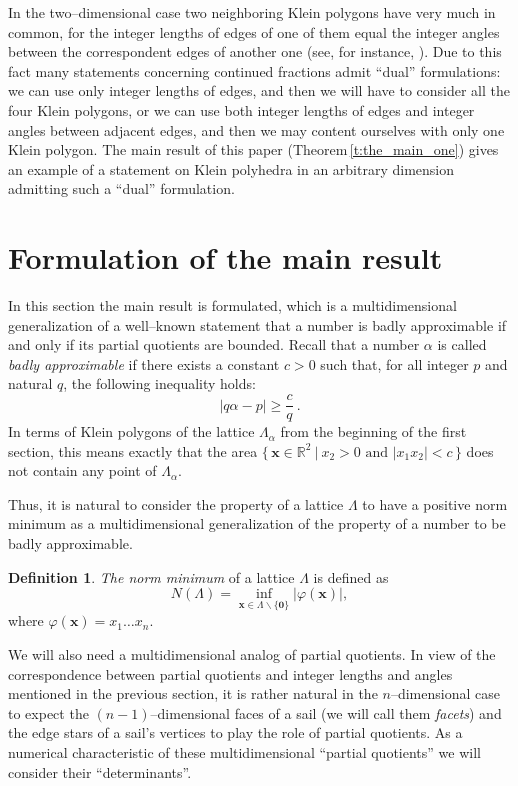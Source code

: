 \documentclass[11pt]{article}
\theoremstyle{definition}
\newtheorem{definition}{Definition}
\theoremstyle{remark}
\theoremstyle{plain}
\renewcommand{\vec}[1]{\mathbf{#1}}
\renewcommand{\geq}{\geqslant}
\newcommand{\La}{\Lambda}
\newcommand{\R}{\mathbb{R}}
\begin{document}
  In the two--dimensional case two neighboring Klein polygons have very much in common, for
  the integer lengths of edges of one of them equal the integer angles between the
  correspondent edges of another one (see, for instance, \cite{korkina_2dim}). Due to this
  fact many statements concerning continued fractions admit ``dual'' formulations: we can use
  only integer lengths of edges, and then we will have to consider all the four Klein
  polygons, or we can use both integer lengths of edges and integer angles between adjacent
  edges, and then we may content ourselves with only one Klein polygon. The main result of
  this paper (Theorem\,\ref{t:the_main_one}) gives an example of a statement on Klein
  polyhedra in an arbitrary dimension admitting such a ``dual'' formulation.




  \section{Formulation of the main result}




  In this section the main result is formulated, which is a
  multidimensional generalization of a well--known statement that a number is badly
  approximable if and only if its partial quotients are bounded. Recall that a number
  $\alpha$ is called \emph{badly approximable} if there exists a constant $c>0$ such that,
  for all integer $p$ and natural $q$, the following inequality holds:
  \[ |q\alpha-p|\geq\frac{c}{q}\ . \]
  In terms of Klein polygons of the lattice $\La_\alpha$ from the beginning of the first
  section, this means exactly that the area
  $ \{ \, \vec x\in\R^2\ |\ x_2>0 \text{ and } |x_1x_2|<c\, \} $
  does not contain any point of $\La_\alpha$.

  Thus, it is natural to consider the property of a lattice $\La$ to have a positive
  norm minimum as a multidimensional generalization of the property of a number to be badly
  approximable.

  \begin{definition}
    \emph{The norm minimum} of a lattice $\La$ is defined as
    \[ N(\La)=\inf_{\vec x\in\La\backslash\{\vec 0\}}|\varphi(\vec x)|, \]
    where $\varphi(\vec x)=x_1\ldots x_n$.
  \end{definition}

  We will also need a multidimensional analog of partial quotients. In view of the
  correspondence between partial quotients and integer lengths and angles mentioned in the
  previous section, it is rather natural in the $n$--dimensional case to expect the
  $(n-1)$--dimensional faces of a sail (we will call them \emph{facets}) and the edge stars
  of a sail's vertices to play the role of partial quotients. As a numerical characteristic
  of these multidimensional ``partial quotients'' we will consider their ``determinants''.
\end{document}
